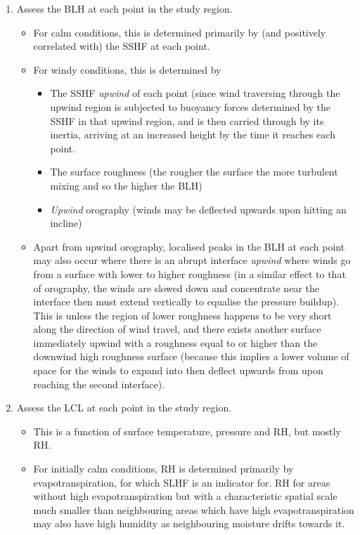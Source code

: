 \begin{enumerate}
	\item Assess the \ac{BLH} at each point in the study region.
	\begin{itemize}
		\item For calm conditions, this is determined primarily by (and positively correlated with) the \ac{SSHF} at each point.
		\item For windy conditions, this is determined by
		\begin{itemize}
			\item The \ac{SSHF} \textit{upwind} of each point (since wind traversing through the upwind region is subjected to buoyancy forces determined by the \ac{SSHF} in that upwind region, and is then carried through by its inertia, arriving at an increased height by the time it reaches each point.
			\item The surface roughness (the rougher the surface the more turbulent mixing and so the higher the \ac{BLH})
			\item \textit{Upwind} orography (winds may be deflected upwards upon hitting an incline)
		\end{itemize}
		\item Apart from upwind orography, localised peaks in the \ac{BLH} at each point may also occur where there is an abrupt interface \textit{upwind} where winds go from a surface with lower to higher roughness (in a similar effect to that of orography, the winds are slowed down and concentrate near the interface then must extend vertically to equalise the pressure buildup). This is unless the region of lower roughness happens to be very short along the direction of wind travel, and there exists another surface immediately upwind with a roughness equal to or higher than the downwind high roughness surface (because this implies a lower volume of space for the winds to expand into then deflect upwards from upon reaching the second interface).
		\end{itemize}
	\item Assess the \ac{LCL} at each point in the study region.
	\begin{itemize}
		\item This is a function of surface temperature, pressure and \ac{RH}, but mostly \ac{RH}.
		\item For initially calm conditions, \ac{RH} is determined primarily by evapotranspiration, for which \ac{SLHF} is an indicator for. \ac{RH} for areas without high evapotranspiration but with a characteristic spatial scale much smaller than neighbouring areas which have high evapotranspiration may also have high humidity as neighbouring moisture drifts towards it.

\end{itemize}
\end{enumerate}

